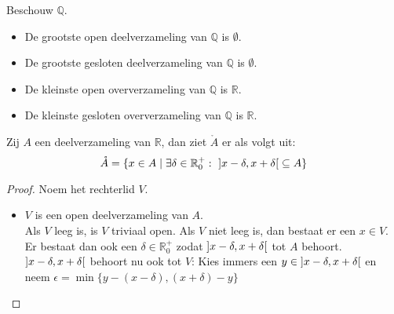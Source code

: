 \documentclass[main.tex]{subfiles}
\begin{document}
\begin{vb}
  Beschouw $\mathbb{Q}$.
  \begin{itemize}
  \item De grootste open deelverzameling van $\mathbb{Q}$ is $\emptyset$.
  \item De grootste gesloten deelverzameling van $\mathbb{Q}$ is $\emptyset$.
  \item De kleinste open oververzameling van $\mathbb{Q}$ is $\mathbb{R}$.
  \item De kleinste gesloten oververzameling van $\mathbb{Q}$ is $\mathbb{R}$.
  \end{itemize}
\feed
\end{vb}

\begin{bpr}
  Zij $A$ een deelverzameling van $\mathbb{R}$, dan ziet $\mathring{A}$ er als volgt uit:
  \[ \mathring{A} = \{ x\in A\mid \exists \delta \in \mathbb{R}_{0}^{+}:\ \interval[open]{x-\delta}{x+\delta} \subseteq A \} \]

  \begin{proof}
    Noem het rechterlid $V$.
    \begin{itemize}
    \item $V$ is een open deelverzameling van $A$.\\
      Als $V$ leeg is, is $V$ triviaal open.
      Als $V$ niet leeg is, dan bestaat er een $x\in V$.
      Er bestaat dan ook een $\delta \in \mathbb{R}_{0}^{+}$ zodat $\interval[open]{x-\delta}{x+\delta}$ tot $A$ behoort.
      $\interval[open]{x-\delta}{x+\delta}$ behoort nu ook tot $V$:
      Kies immers een $y\in \interval[open]{x-\delta}{x+\delta}$ en neem $\epsilon = \min\{y-(x-\delta),(x+\delta)-y\}$
      \begin{figure}[H]
        \centering
\end{figure}
\end{itemize}
\end{proof}
\end{bpr}
\end{document}
